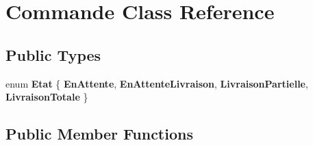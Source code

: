 \hypertarget{class_commande}{
\section{Commande Class Reference}
\label{class_commande}
}
\subsection*{Public Types}
\begin{DoxyCompactItemize}
\item 
enum {\bfseries Etat} \{ {\bfseries EnAttente}, 
{\bfseries EnAttenteLivraison}, 
{\bfseries LivraisonPartielle}, 
{\bfseries LivraisonTotale}
 \}
\end{DoxyCompactItemize}
\subsection*{Public Member Functions}
